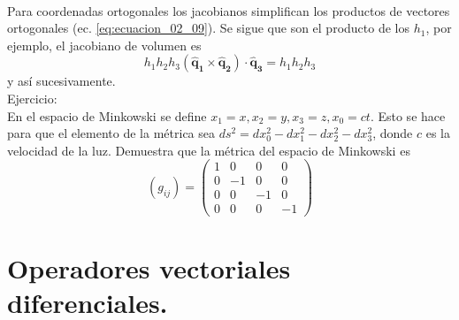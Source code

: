 \\
Para coordenadas ortogonales los jacobianos simplifican los productos de vectores ortogonales (ec. \ref{eq:ecuacion_02_09}). Se sigue que son el producto de los $h_{1}$, por ejemplo, el jacobiano de volumen es
\[ h_{1} h_{2} h_{3} (\mathbf{\widehat{q}_{1}} \times \mathbf{\widehat{q}_{2}} ) \cdot \mathbf{\widehat{q}_{3}} = h_{1} h_{2} h_{3} \]
y así sucesivamente.
\\
Ejercicio:
\\
En el espacio de Minkowski se define $x_{1} = x, x_{2} = y, x_{3} = z, x_{0} = ct$. Esto se hace para que el elemento de la métrica sea $ds^{2} = dx_{0}^{2} - dx_{1}^{2} - dx_{2}^{2} - dx_{3}^{2}$, donde $c$ es la velocidad de la luz. Demuestra que la métrica del espacio de Minkowski es
\[ (g_{ij}) = \begin{pmatrix}
1 & 0 & 0 & 0 \\
0 & -1 & 0 & 0 \\
0 & 0 & -1 & 0 \\
0 & 0 & 0 & -1
\end{pmatrix} \] 
\section{Operadores vectoriales diferenciales.}
